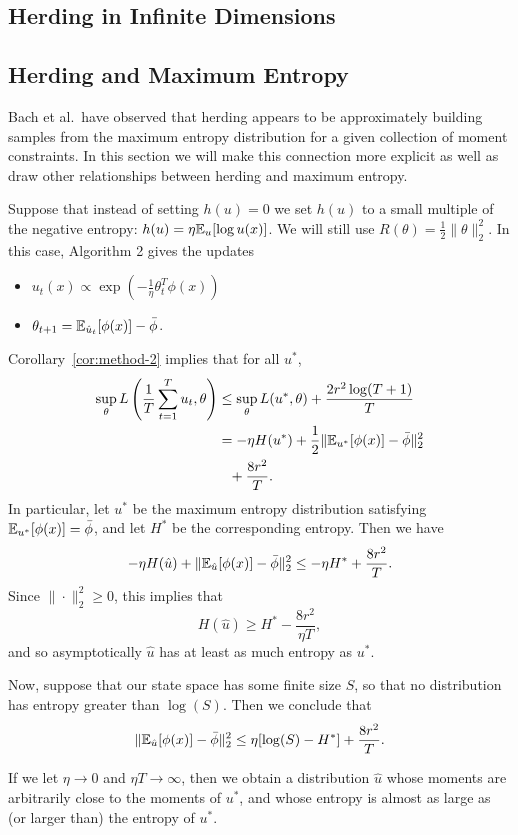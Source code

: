 \documentclass[paper.tex]{subfiles}
\begin{document}
\subsection{Herding in Infinite Dimensions}
\label{sec:infinite-case}

\subsection{Herding and Maximum Entropy}
\label{sec:max-ent}

Bach et al.~have observed that herding appears to be approximately building 
samples from the maximum entropy distribution for a given collection of moment 
constraints. In this section we will make this connection more explicit 
as well as draw other relationships between herding and maximum entropy.

Suppose that instead of setting $h(u) = 0$ we set $h(u)$ to a small multiple of 
the negative entropy: $h(u) = \eta \mathbb{E}_{u}[\log u(x)]$. We will still use 
$R(\theta) = \frac{1}{2}\|\theta\|_2^2$. In this case, Algorithm 2 gives the updates
\begin{itemize}
\item $u_t(x) \propto \exp\left(-\frac{1}{\eta}\theta_t^T\phi(x)\right)$
\item $\theta_{t+1} = \mathbb{E}_{\hat{u}_t}[\phi(x)] - \bar\phi$.
\end{itemize}
Corollary~\ref{cor:method-2} implies that for all $u^{*}$,
\begin{align*}
\sup_{\theta} L\left(\frac{1}{T} \sum_{t=1}^T u_t, \theta\right) &\leq \sup_{\theta} L(u^*, \theta) + \frac{2r^2\log(T+1)}{T} \\
 &= -\eta H(u^*) + \frac{1}{2}\|\mathbb{E}_{u^*}[\phi(x)]-\bar{\phi}\|_2^2 \\ &\phantom{=} + \frac{8r^2}{T}.
\end{align*}
In particular, let $u^*$ be the maximum entropy distribution satisfying $\mathbb{E}_{u^*}[\phi(x)] = \bar{\phi}$, 
and let $H^*$ be the corresponding entropy. Then we have 
\[ -\eta H(\hat{u}) + \|\mathbb{E}_{\hat{u}}[\phi(x)]-\bar{\phi}\|_2^2 \leq -\eta H^* + \frac{8r^2}{T}. \]
Since $\|\cdot\|_2^2 \geq 0$, this implies that 
\begin{equation}
H(\hat{u}) \geq H^* - \frac{8r^2}{\eta T},
\end{equation}
and so asymptotically $\hat{u}$ has at least 
as much entropy as $u^*$.

Now, suppose that our state space has some finite size $S$, so 
that no distribution has entropy greater than $\log(S)$. Then 
we conclude that
\begin{equation}
\|\mathbb{E}_{\hat{u}}[\phi(x)]-\bar{\phi}\|_2^2 \leq \eta[\log(S)-H^*] + \frac{8r^2}{T}.
\end{equation}

If we let $\eta \to 0$ and $\eta T \to \infty$, then we obtain 
a distribution $\hat{u}$ whose moments are arbitrarily close to 
the moments of $u^*$, and whose entropy is almost as large as 
(or larger than) the entropy of $u^*$. 
\end{document}
